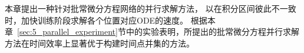 
本章提出一种针对批常微分方程网络的并行求解方法，
以在积分区间彼此不一致时，加快训练阶段求解各个位置对应ODE的速度。
根据本章~\ref{sec:5_parallel_experiment}节中的实验表明，所提出的批常微分方程并行求解方法在时间效率上显著优于构建时间点并集的方法。


